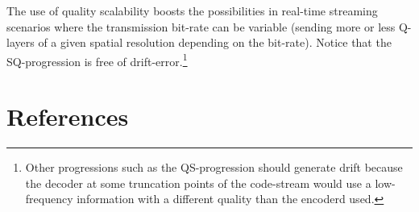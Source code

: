 The use of quality scalability boosts the possibilities in real-time
streaming scenarios where the transmission bit-rate can be variable
(sending more or less Q-layers of a given spatial resolution depending
on the bit-rate). Notice that the SQ-progression is free of
drift-error.\footnote{Other progressions such as the QS-progression
  should generate drift because the decoder at some truncation points
  of the code-stream would use a low-frequency information with a
  different quality than the encoderd used.}



\section{References}

\renewcommand{\addcontentsline}[3]{}%

